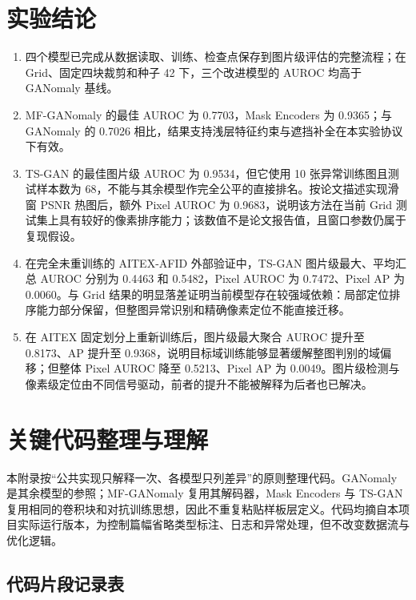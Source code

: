 \documentclass[UTF8,12pt]{ctexart}
\begin{document}
\section{实验结论}

\begin{enumerate}
  \item 四个模型已完成从数据读取、训练、检查点保存到图片级评估的完整流程；在 Grid、固定四块裁剪和种子 42 下，三个改进模型的 AUROC 均高于 GANomaly 基线。
  \item MF-GANomaly 的最佳 AUROC 为 0.7703，Mask Encoders 为 0.9365；与 GANomaly 的 0.7026 相比，结果支持浅层特征约束与遮挡补全在本实验协议下有效。
  \item TS-GAN 的最佳图片级 AUROC 为 0.9534，但它使用 10 张异常训练图且测试样本数为 68，不能与其余模型作完全公平的直接排名。按论文描述实现滑窗 PSNR 热图后，额外 Pixel AUROC 为 0.9683，说明该方法在当前 Grid 测试集上具有较好的像素排序能力；该数值不是论文报告值，且窗口参数仍属于复现假设。
  \item 在完全未重训练的 AITEX-AFID 外部验证中，TS-GAN 图片级最大、平均汇总 AUROC 分别为 0.4463 和 0.5482，Pixel AUROC 为 0.7472、Pixel AP 为 0.0060。与 Grid 结果的明显落差证明当前模型存在较强域依赖：局部定位排序能力部分保留，但整图异常识别和精确像素定位不能直接迁移。
  \item 在 AITEX 固定划分上重新训练后，图片级最大聚合 AUROC 提升至 0.8173、AP 提升至 0.9368，说明目标域训练能够显著缓解整图判别的域偏移；但整体 Pixel AUROC 降至 0.5213、Pixel AP 为 0.0049。图片级检测与像素级定位由不同信号驱动，前者的提升不能被解释为后者也已解决。
\end{enumerate}

\appendix
\clearpage
\section{关键代码整理与理解}

\noindent 本附录按“公共实现只解释一次、各模型只列差异”的原则整理代码。GANomaly 是其余模型的参照；MF-GANomaly 复用其解码器，Mask Encoders 与 TS-GAN 复用相同的卷积块和对抗训练思想，因此不重复粘贴样板层定义。代码均摘自本项目实际运行版本，为控制篇幅省略类型标注、日志和异常处理，但不改变数据流与优化逻辑。

\subsection{代码片段记录表}
\end{document}
